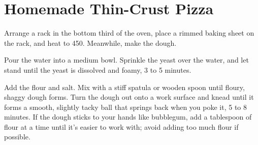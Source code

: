\section{Homemade Thin-Crust Pizza}
\begin{recipe}




	Arrange a rack in the bottom third of the oven, place a rimmed baking sheet on the rack, and heat to 450. Meanwhile, make the dough.

	Pour the water into a medium bowl. Sprinkle the yeast over the water, and let stand until the yeast is dissolved and foamy, 3 to 5 minutes.

	Add the flour and salt. Mix with a stiff spatula or wooden spoon until floury, shaggy dough forms. Turn the dough out onto a work surface and knead until it forms a smooth, slightly tacky ball that springs back when you poke it, 5 to 8 minutes. If the dough sticks to your hands like bubblegum, add a tablespoon of flour at a time until it’s easier to work with; avoid adding too much flour if possible.


\end{recipe}
